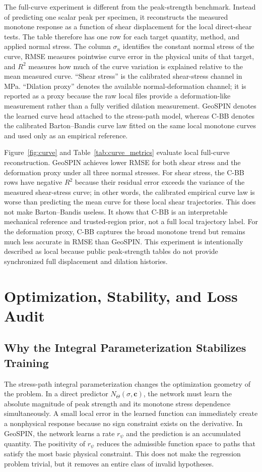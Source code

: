 \documentclass[journal]{IEEEtran}
\begin{document}
The full-curve experiment is different from the peak-strength benchmark. Instead of predicting one scalar peak per specimen, it reconstructs the measured monotone response as a function of shear displacement for the local direct-shear tests. The table therefore has one row for each target quantity, method, and applied normal stress. The column $\sigma_n$ identifies the constant normal stress of the curve, RMSE measures pointwise curve error in the physical units of that target, and $R^2$ measures how much of the curve variation is explained relative to the mean measured curve. ``Shear stress'' is the calibrated shear-stress channel in MPa. ``Dilation proxy'' denotes the available normal-deformation channel; it is reported as a proxy because the raw local files provide a deformation-like measurement rather than a fully verified dilation measurement. GeoSPIN denotes the learned curve head attached to the stress-path model, whereas C-BB denotes the calibrated Barton--Bandis curve law fitted on the same local monotone curves and used only as an empirical reference.



Figure~\ref{fig:curve} and Table~\ref{tab:curve_metrics} evaluate local full-curve reconstruction. GeoSPIN achieves lower RMSE for both shear stress and the deformation proxy under all three normal stresses. For shear stress, the C-BB rows have negative $R^2$ because their residual error exceeds the variance of the measured shear-stress curve; in other words, the calibrated empirical curve law is worse than predicting the mean curve for these local shear trajectories. This does not make Barton--Bandis useless. It shows that C-BB is an interpretable mechanical reference and trusted-region prior, not a full local trajectory label. For the deformation proxy, C-BB captures the broad monotone trend but remains much less accurate in RMSE than GeoSPIN. This experiment is intentionally described as local because public peak-strength tables do not provide synchronized full displacement and dilation histories.

\section{Optimization, Stability, and Loss Audit}
\subsection{Why the Integral Parameterization Stabilizes Training}
The stress-path integral parameterization changes the optimization geometry of the problem. In a direct predictor $N_{\Theta}(\sigma,\mathbf{c})$, the network must learn the absolute magnitude of peak strength and its monotone stress dependence simultaneously. A small local error in the learned function can immediately create a nonphysical response because no sign constraint exists on the derivative. In GeoSPIN, the network learns a rate $r_{\psi}$ and the prediction is an accumulated quantity. The positivity of $r_{\psi}$ reduces the admissible function space to paths that satisfy the most basic physical constraint. This does not make the regression problem trivial, but it removes an entire class of invalid hypotheses.
\end{document}
